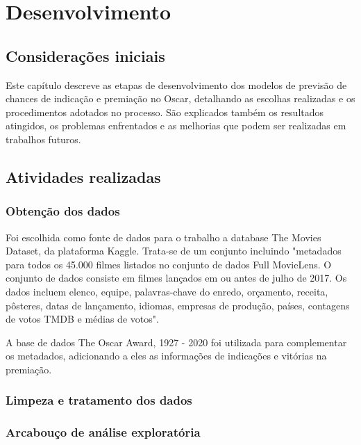 

\chapter[Desenvolvimento]{Desenvolvimento}

    \section{Considerações iniciais}
    Este capítulo descreve as etapas de desenvolvimento dos modelos de previsão de chances de indicação e premiação no Oscar, detalhando as escolhas realizadas e os procedimentos adotados no processo. São explicados também os resultados atingidos, os problemas enfrentados e as melhorias que podem ser realizadas em trabalhos futuros.
    
    \section{Atividades realizadas}
    
        \subsection{Obtenção dos dados}
        Foi escolhida como fonte de dados para o trabalho a database The Movies Dataset, da plataforma Kaggle. Trata-se de um conjunto incluindo "metadados para todos os 45.000 filmes listados no conjunto de dados Full MovieLens. O conjunto de dados consiste em filmes lançados em ou antes de julho de 2017. Os dados incluem elenco, equipe, palavras-chave do enredo, orçamento, receita, pôsteres, datas de lançamento, idiomas, empresas de produção, países, contagens de votos TMDB e médias de votos".\cite{kaggle2017}\par
        
        A base de dados The Oscar Award, 1927 - 2020 foi utilizada para complementar os metadados, adicionando a eles as informações de indicações e vitórias na premiação.\cite{kaggle2019}\par

        \subsection{Limpeza e tratamento dos dados}

        \subsection{Arcabouço de análise exploratória}

